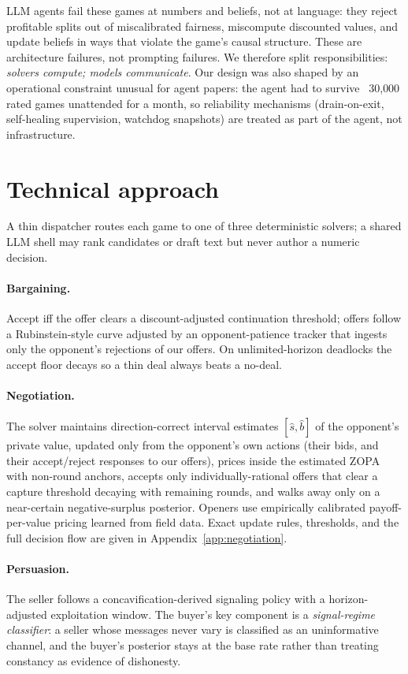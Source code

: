 \documentclass{article}
\begin{document}
LLM agents fail these games at numbers and beliefs, not at language: they reject profitable splits out of miscalibrated fairness, miscompute discounted values, and update beliefs in ways that violate the game's causal structure. These are architecture failures, not prompting failures. We therefore split responsibilities: \emph{solvers compute; models communicate}. Our design was also shaped by an operational constraint unusual for agent papers: the agent had to survive ~30{,}000 rated games unattended for a month, so reliability mechanisms (drain-on-exit, self-healing supervision, watchdog snapshots) are treated as part of the agent, not infrastructure.

\section{Technical approach}
A thin dispatcher routes each game to one of three deterministic solvers; a shared LLM shell may rank candidates or draft text but never author a numeric decision.

\paragraph{Bargaining.} Accept iff the offer clears a discount-adjusted continuation threshold; offers follow a Rubinstein-style curve adjusted by an opponent-patience tracker that ingests only the opponent's rejections of our offers. On unlimited-horizon deadlocks the accept floor decays so a thin deal always beats a no-deal.

\paragraph{Negotiation.} The solver maintains direction-correct interval estimates $[\hat{s}, \hat{b}]$ of the opponent's private value, updated only from the opponent's own actions (their bids, and their accept/reject responses to our offers), prices inside the estimated ZOPA with non-round anchors, accepts only individually-rational offers that clear a capture threshold decaying with remaining rounds, and walks away only on a near-certain negative-surplus posterior. Openers use empirically calibrated payoff-per-value pricing learned from field data. Exact update rules, thresholds, and the full decision flow are given in Appendix~\ref{app:negotiation}.

\paragraph{Persuasion.} The seller follows a concavification-derived signaling policy with a horizon-adjusted exploitation window. The buyer's key component is a \emph{signal-regime classifier}: a seller whose messages never vary is classified as an uninformative channel, and the buyer's posterior stays at the base rate rather than treating constancy as evidence of dishonesty.
\end{document}
